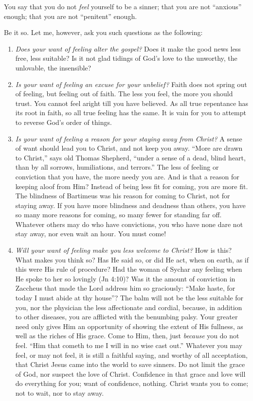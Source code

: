 \documentclass[
]{book}
\begin{document}
You say that you do not \emph{feel} yourself to be a sinner; that you are not ``anxious'' enough; that you are not ``penitent'' enough.

Be it so. Let me, however, ask you such questions as the following:

\begin{enumerate}
\def\labelenumi{\arabic{enumi}.}
\item
  \emph{Does your want of feeling alter the gospel?} Does it make the good news less free, less suitable? Is it not glad tidings of God's love to the unworthy, the unlovable, the insensible?
\item
  \emph{Is your want of feeling an excuse for your unbelief?} Faith does not spring out of feeling, but feeling out of faith. The less you feel, the more you should trust. You cannot feel aright till you have believed. As all true repentance has its root in faith, so all true feeling has the same. It is vain for you to attempt to reverse God's order of things.
\item
  \emph{Is your want of feeling a reason for your staying away from Christ?} A sense of want should lead you to Christ, and not keep you away. ``More are drawn to Christ,'' says old Thomas Shepherd, ``under a sense of a dead, blind heart, than by all sorrows, humiliations, and terrors.'' The less of feeling or conviction that you have, the more needy you are. And is that a reason for keeping aloof from Him? Instead of being less fit for coming, you are more fit. The blindness of Bartimeus was his reason for coming to Christ, not for staying away. If you have more blindness and deadness than others, you have so many more reasons for coming, so many fewer for standing far off. Whatever others may do who have convictions, you who have none dare not stay away, nor even wait an hour. You must come!
\item
  \emph{Will your want of feeling make you less welcome to Christ?} How is this? What makes you think so? Has He said so, or did He act, when on earth, as if this were His rule of procedure? Had the woman of Sychar any feeling when He spoke to her so lovingly (Jn 4:10)? Was it the amount of conviction in Zaccheus that made the Lord address him so graciously: ``Make haste, for today I must abide at thy house''? The balm will not be the less suitable for you, nor the physician the less affectionate and cordial, because, in addition to other diseases, you are afflicted with the benumbing palsy. Your greater need only gives Him an opportunity of showing the extent of His fullness, as well as the riches of His grace. Come to Him, then, just \emph{because} you do not feel. ``Him that cometh to me I will in no wise cast out.'' Whatever you may feel, or may not feel, it is still a faithful saying, and worthy of all acceptation, that Christ Jesus came into the world to save sinners. Do not limit the grace of God, nor suspect the love of Christ. Confidence in that grace and love will do everything for you; want of confidence, nothing. Christ wants you to come; not to wait, nor to stay away.

\end{enumerate}
\end{document}
